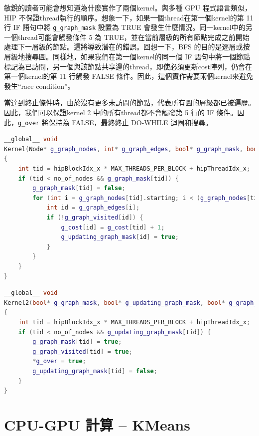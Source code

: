 \vspace{1em}
敏銳的讀者可能會想知道為什麼實作了兩個kernel。與多種 GPU 程式語言類似，HIP 不保證thread執行的順序。想象一下，如果一個thread在第一個kernel的第 11 行 IF 語句中將 \texttt{g\_graph\_mask} 設置為 TRUE 會發生什麼情況。同一kernel中的另一個thread可能會觸發條件 5 為 TRUE，並在當前層級的所有節點完成之前開始處理下一層級的節點。這將導致潛在的錯誤。回想一下，BFS 的目的是逐層或按層級地搜尋圖。同樣地，如果我們在第一個kernel的同一個 IF 語句中將一個節點標記為已訪問，另一個與該節點共享邊的thread，即使必須更新cost陣列，仍會在第一個kernel的第 11 行觸發 FALSE 條件。因此，這個實作需要兩個kernel來避免發生“race condition”。

\vspace{1em}
當達到終止條件時，由於沒有更多未訪問的節點，代表所有圖的層級都已被遍歷。因此，我們可以保證kernel 2 中的所有thread都不會觸發第 5 行的 IF 條件。因此，\texttt{g\_over} 將保持為 FALSE，最終終止 DO-WHILE 迴圈和搜尋。

\lstset{style=mystyle}
\begin{lstlisting}[language=c++,caption={BFS的kernel1}]
__global__ void
Kernel(Node* g_graph_nodes, int* g_graph_edges, bool* g_graph_mask, bool* g_updating_graph_mask, bool *g_graph_visited, int* g_cost, int no_of_nodes)
{
    int tid = hipBlockIdx_x * MAX_THREADS_PER_BLOCK + hipThreadIdx_x;
    if (tid < no_of_nodes && g_graph_mask[tid]) {
        g_graph_mask[tid] = false;
        for (int i = g_graph_nodes[tid].starting; i < (g_graph_nodes[tid].no_of_edges + g_graph_nodes[tid].starting); i++) {
            int id = g_graph_edges[i];
            if (!g_graph_visited[id]) {
                g_cost[id] = g_cost[tid] + 1;
                g_updating_graph_mask[id] = true;
            }
        }
    }
}
\end{lstlisting}

\lstset{style=mystyle}
\begin{lstlisting}[language=c++,caption={BFS的kernel2}]
__global__ void
Kernel2(bool* g_graph_mask, bool* g_updating_graph_mask, bool* g_graph_visited, bool* g_over, int no_of_nodes)
{
    int tid = hipBlockIdx_x * MAX_THREADS_PER_BLOCK + hipThreadIdx_x;
    if (tid < no_of_nodes && g_updating_graph_mask[tid]) {
        g_graph_mask[tid] = true;
        g_graph_visited[tid] = true;
        *g_over = true;
        g_updating_graph_mask[tid] = false;
    }
}
\end{lstlisting}
\section{CPU-GPU 計算 – KMeans}

